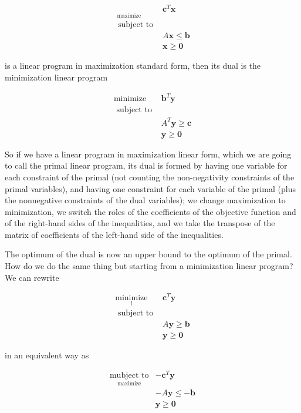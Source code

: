 \documentclass[letter,12pt]{book}
\renewcommand{\0}{\mathbf{0}}
\begin{document}
$$
\begin{array}{ll}
\underset{\text { maximize }}{ } & \mathbf{c}^{T} \mathbf{x} \\
\text { subject to } & \\
& A \mathbf{x} \leq \mathbf{b} \\
& \mathbf{x} \geq \mathbf{0}
\end{array}
$$

is a linear program in maximization standard form, then its dual is the minimization linear program

$$
\begin{array}{ll}
\operatorname{minimize} & \mathbf{b}^{T} \mathbf{y} \\
\text { subject to } & \\
& A^{T} \mathbf{y} \geq \mathbf{c} \\
& \mathbf{y} \geq \mathbf{0}
\end{array}
$$

So if we have a linear program in maximization linear form, which we are going to call the primal linear program, its dual is formed by having one variable for each constraint of the primal (not counting the non-negativity constraints of the primal variables), and having one constraint for each variable of the primal (plus the nonnegative constraints of the dual variables); we change maximization to minimization, we switch the roles of the coefficients of the objective function and of the right-hand sides of the inequalities, and we take the transpose of the matrix of coefficients of the left-hand side of the inequalities.

The optimum of the dual is now an upper bound to the optimum of the primal. How do we do the same thing but starting from a minimization linear program? We can rewrite

$$
\begin{array}{ll}
\underset{l}{\operatorname{minimize}} & \mathbf{c}^{T} \mathbf{y} \\
\text { subject to } & \\
& A \mathbf{y} \geq \mathbf{b} \\
& \mathbf{y} \geq \mathbf{0}
\end{array}
$$

in an equivalent way as

$$
\begin{array}{ll}
\underset{\operatorname{maximize}}{\operatorname{mubject~to}} & -\mathbf{c}^{T} \mathbf{y} \\
& -A \mathbf{y} \leq-\mathbf{b} \\
& \mathbf{y} \geq \mathbf{0}
\end{array}
$$
\end{document}
